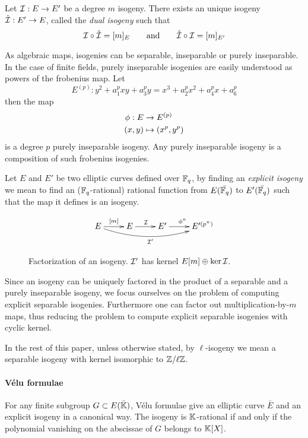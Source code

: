 \begin{definition}
  Let $\mathcal{I} : E \rightarrow E'$ be a degree $m$ isogeny. There exists an
  unique isogeny $\hat{\mathcal{I}} : E' \rightarrow E$, called the \emph{dual
    isogeny} such that
  \[\mathcal{I}\circ\hat{\mathcal{I}} = [m]_E \qquad\text{and}\qquad \hat{\mathcal{I}}\circ\mathcal{I} =
  [m]_{E'}\]
\end{definition}

As algebraic maps, isogenies can be separable, inseparable or purely
inseparable. In the case of finite fields, purely inseparable
isogenies are easily understood as powers of the frobenius map. Let
\[E^{(p)} : y^2 + a_1^pxy + a_3^py = x^3 + a_2^px^2 + a_4^px + a_6^p\]
then the map
\begin{align*}
  \phi : E &\rightarrow E^{(p)}\\
          (x,y) &\mapsto (x^p,y^p)
\end{align*}
is a degree $p$ purely inseparable isogeny. Any purely inseparable
isogeny is a composition of such frobenius isogenies.

Let $E$ and $E'$ be two elliptic curves defined over $\mathbb{F}_q$, by
finding an \emph{explicit isogeny} we mean to find an
($\mathbb{F}_q$-rational) rational function from $E(\bar{\mathbb{F}_q})$ to
$E'(\bar{\mathbb{F}_q})$ such that the map it defines is an isogeny.

\begin{figure}
  \centering
  \[\xymatrix{
    E \ar[r]^{[m]}\ar@/_1pc/[rrr]_{\I'} & E \ar[r]^\I & E' \ar[r]^{\frobisog^n} & E'^{(p^n)}\\
  }\]
  \caption{Factorization of an isogeny. $\mathcal{I}'$ has kernel $E[m]\oplus\ker\mathcal{I}$.}
\end{figure}

Since an isogeny can be uniquely factored in the product of a
separable and a purely inseparable isogeny, we focus ourselves on the
problem of computing explicit separable isogenies. Furthermore one can
factor out multiplication-by-$m$ maps, thus reducing the problem to
compute explicit separable isogenies with cyclic kernel.

In the rest of this paper, unless otherwise stated, by $\ell$-isogeny
we mean a separable isogeny with kernel isomorphic to $\mathbb{Z}/\ell\mathbb{Z}$.

\paragraph{Vélu formulae}
For any finite subgroup $G \subset E(\bar{\mathbb{K}})$, Vélu formulae
\cite{Vel71} give an elliptic curve $\bar{E}$ and an explicit
isogeny in a canonical way. The isogeny is $\mathbb{K}$-rational if and only
if the polynomial vanishing on the abscissae of $G$ belongs to
$\mathbb{K}[X]$.

